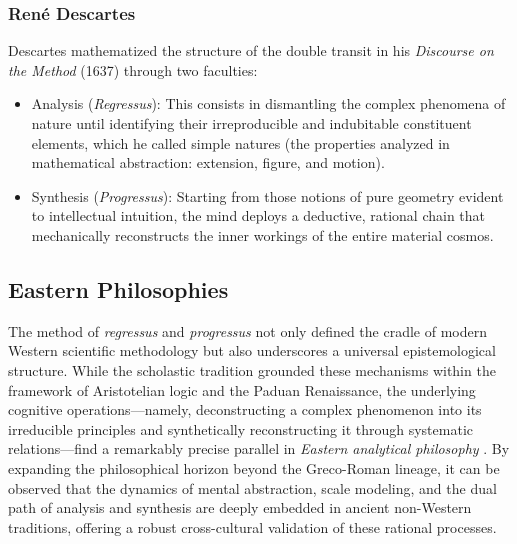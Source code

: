 \documentclass[11pt, a4paper]{article}
\begin{document}
\subsubsection*{René Descartes}
Descartes mathematized the structure of the double transit in his \textit{Discourse on the Method} (1637) through two faculties:
\begin{itemize}
	\item \textrm{Analysis (\textit{Regressus}):} This consists in dismantling the complex phenomena of nature until identifying their irreproducible and indubitable constituent elements, which he called \textrm{simple natures} (the properties analyzed in mathematical abstraction: extension, figure, and motion).
	\item \textrm{Synthesis (\textit{Progressus}):} Starting from those notions of pure geometry evident to intellectual intuition, the mind deploys a deductive, rational chain that mechanically reconstructs the inner workings of the entire material cosmos.
\end{itemize}





\subsection{Eastern Philosophies}

The method of \textit{regressus} and \textit{progressus} not only defined the cradle of modern Western scientific methodology but also underscores a universal epistemological structure. While the scholastic tradition grounded these mechanisms within the framework of Aristotelian logic and the Paduan Renaissance, the underlying cognitive operations---namely, deconstructing a complex phenomenon into its irreducible principles and synthetically reconstructing it through systematic relations---find a remarkably precise parallel in \textit{Eastern analytical philosophy} \cite{Mou2000TwoRoads}. By expanding the philosophical horizon beyond the Greco-Roman lineage,
it can be observed that the dynamics of mental abstraction, scale modeling, and the dual path of analysis and synthesis are deeply embedded in ancient non-Western traditions, offering a robust cross-cultural validation of these rational processes.

\end{document}
